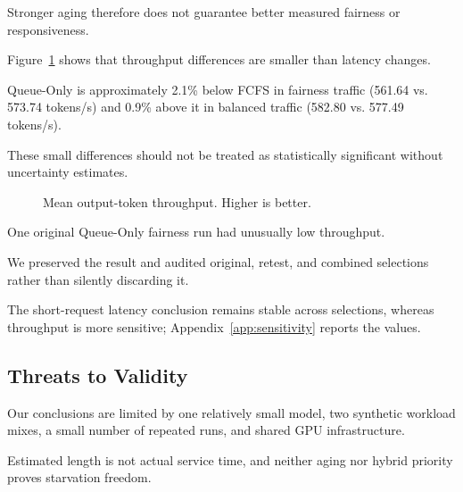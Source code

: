 \documentclass[sigplan,nonacm]{acmart}
\begin{document}
Stronger aging therefore does not guarantee
better measured fairness or responsiveness.

Figure~\ref{fig:throughput} shows that throughput
differences are smaller than latency changes.

Queue-Only is approximately 2.1\% below FCFS
in fairness traffic
(561.64 vs. 573.74 tokens/s)
and 0.9\% above it in balanced traffic
(582.80 vs. 577.49 tokens/s).

These small differences should not be treated
as statistically significant without
uncertainty estimates.

\begin{figure}[t]
\centering
{}
\caption{
Mean output-token throughput.
Higher is better.
}
\label{fig:throughput}
\end{figure}

One original Queue-Only fairness run
had unusually low throughput.

We preserved the result and audited original,
retest, and combined selections rather than
silently discarding it.

The short-request latency conclusion remains
stable across selections, whereas throughput
is more sensitive; Appendix~\ref{app:sensitivity}
reports the values.

\subsection{Threats to Validity}

Our conclusions are limited by one relatively
small model, two synthetic workload mixes,
a small number of repeated runs,
and shared GPU infrastructure.

Estimated length is not actual service time,
and neither aging nor hybrid priority
proves starvation freedom.
\end{document}
